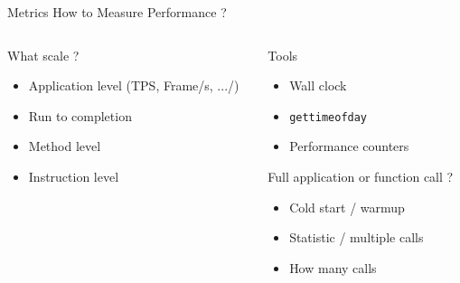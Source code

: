 %
\begin{Frame}{Metrics How to Measure Performance ?}
  \begin{columns}[t]
    \begin{column}{5cm} %
      \begin{block}{What scale ?}
        \begin{itemize}
        \item Application level (TPS, Frame/s, .../)
        \item Run to completion
        \item Method level
        \item Instruction level
        \end{itemize}
      \end{block} 
    \end{column}
    
    \begin{column}{5cm} %
      \begin{block}{Tools}
        \begin{itemize}
        \item Wall clock
        \item \texttt{gettimeofday}
        \item Performance counters
        \end{itemize}
      \end{block}   
      \begin{alertblock}{Full application or function call ?}
        \begin{itemize}
        \item Cold start / warmup\TBD
        \item Statistic / multiple calls
        \item How many calls
        \end{itemize}
      \end{alertblock}
    \end{column}
  \end{columns}  
\end{Frame}


